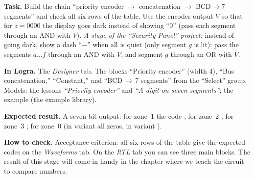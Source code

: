 \begin{diybox}
\textbf{Task.}  Build the chain ``priority encoder
$\to$ concatenation $\to$ BCD$\to$7 segments'' and check all six
rows of the table.  Use the encoder output $V$ so that for
$z=0000$ the display goes dark instead of showing ``0'' (pass each segment
through an AND with $V$).  \emph{A stage of the ``Security Panel'' project:} instead of
going dark, show a dash ``$-$'' when all is quiet (only segment
$g$ is lit): pass the segments $a\ldots f$ through an AND with $V$, and segment $g$
through an OR with $\overline V$.

\textbf{In Logra.} The \emph{Designer} tab. The blocks ``Priority
encoder'' (width 4), ``Bus concatenation,'' ``Constant,'' and ``BCD\,$\to$\,7
segments'' from the ``Select'' group. Models: the lessons \emph{``Priority
encoder''} and \emph{``A digit on seven segments''}; the example
 (the example library).

\textbf{Expected result.} A seven-bit output: for zone~1 the code
, for zone~2 , for zone~3
; for zone~0  (in variant 
all zeros, in variant  ).

\textbf{How to check.} Acceptance criterion: all six rows of the table give the
expected codes on the \emph{Waveforms} tab. On the \emph{RTL} tab you can see
three main blocks. The result of this stage will come in handy in the chapter where
we teach the circuit to compare numbers.
\end{diybox}

